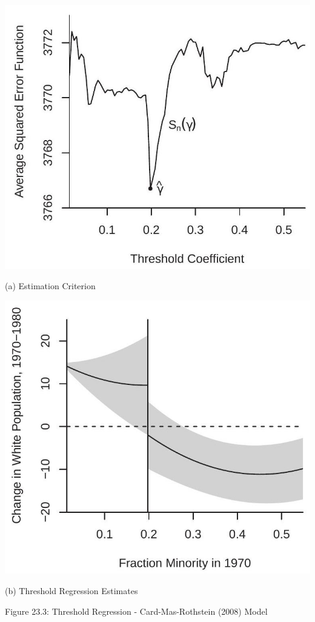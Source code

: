 \documentclass[10pt]{article}
\begin{document}
\includegraphics[max width=\textwidth]{2022_10_23_afe6a5896d8677a5cd30g-10}

(a) Estimation Criterion

\includegraphics[max width=\textwidth]{2022_10_23_afe6a5896d8677a5cd30g-10(1)}

(b) Threshold Regression Estimates

Figure 23.3: Threshold Regression - Card-Mas-Rothstein (2008) Model
\end{document}
